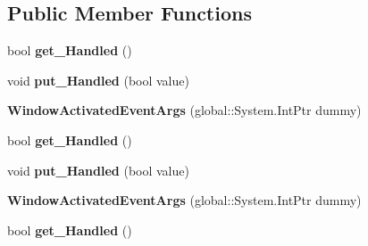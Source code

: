 \subsection*{Public Member Functions}
\begin{DoxyCompactItemize}
\item 
\mbox{\label{class_windows_1_1_u_i_1_1_core_1_1_window_activated_event_args_a33f32bbcb0967f8b46db04ffa5a1cf9d}} 
bool {\bfseries get\+\_\+\+Handled} ()
\item 
\mbox{\label{class_windows_1_1_u_i_1_1_core_1_1_window_activated_event_args_a8a9b5417b4aa85225bea407fd08733b9}} 
void {\bfseries put\+\_\+\+Handled} (bool value)
\item 
\mbox{\label{class_windows_1_1_u_i_1_1_core_1_1_window_activated_event_args_a8fe24b3135f22741f9a23f52f8e0ae14}} 
{\bfseries Window\+Activated\+Event\+Args} (global\+::\+System.\+Int\+Ptr dummy)
\item 
\mbox{\label{class_windows_1_1_u_i_1_1_core_1_1_window_activated_event_args_a33f32bbcb0967f8b46db04ffa5a1cf9d}} 
bool {\bfseries get\+\_\+\+Handled} ()
\item 
\mbox{\label{class_windows_1_1_u_i_1_1_core_1_1_window_activated_event_args_a8a9b5417b4aa85225bea407fd08733b9}} 
void {\bfseries put\+\_\+\+Handled} (bool value)
\item 
\mbox{\label{class_windows_1_1_u_i_1_1_core_1_1_window_activated_event_args_a8fe24b3135f22741f9a23f52f8e0ae14}} 
{\bfseries Window\+Activated\+Event\+Args} (global\+::\+System.\+Int\+Ptr dummy)
\item 
\mbox{\label{class_windows_1_1_u_i_1_1_core_1_1_window_activated_event_args_a33f32bbcb0967f8b46db04ffa5a1cf9d}} 
bool {\bfseries get\+\_\+\+Handled} ()
\item 
\mbox{\label{class_windows_1_1_u_i_1_1_core_1_1_window_activated_event_args_a8a9b5417b4aa85225bea407fd08733b9}} 

\end{DoxyCompactItemize}
